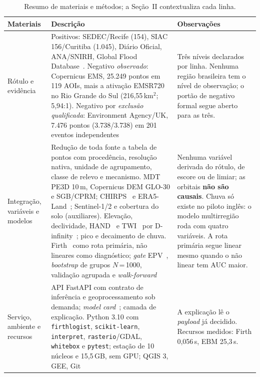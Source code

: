 \documentclass[conference]{IEEEtran}
\begin{document}
\begin{table}[!t]
\caption{Resumo de materiais e métodos; a Seção~II contextualiza cada linha.}
\label{tab:mm}
\centering
\renewcommand{\arraystretch}{0.95}
\scriptsize
\begin{tabular}{@{}>{\raggedright\arraybackslash}p{2.05cm}>{\raggedright\arraybackslash}p{7.6cm}>{\raggedright\arraybackslash}p{6.5cm}@{}}
\toprule
\textbf{Materiais} & \textbf{Descrição} & \textbf{Observações} \\
\midrule
Rótulo e evidência &
Positivos: SEDEC/Recife (154), SIAC 156/Curitiba (1.045), Diário Oficial,
ANA/SNIRH, Global Flood Database~\cite{tellman2021}. Negativo \emph{observado}:
Copernicus EMS, 25.249 pontos em 119 AOIs, mais a ativação EMSR720 no Rio Grande do
Sul (216,55\,km$^2$; 5,94:1). Negativo por \emph{exclusão qualificada}: Environment
Agency/UK, 7.476 pontos (3.738/3.738) em 201 eventos independentes &
Três níveis declarados por linha. Nenhuma região brasileira tem o nível de
observação; o portão de negativo formal segue aberto para as três. \\
Integração, variáveis e modelos &
Redução de toda fonte a tabela de pontos com procedência, resolução nativa, unidade
de agrupamento, classe de relevo e mecanismo. MDT PE3D 10\,m, Copernicus DEM GLO-30 e
SGB/CPRM; CHIRPS~\cite{funk2015} e ERA5-Land~\cite{munoz2021}; Sentinel-1/2 e cobertura
do solo (auxiliares). Elevação, declividade, HAND~\cite{renno2008} e TWI~\cite{beven1979}
por D-infinity~\cite{tarboton1997}; pico e decaimento de chuva. Firth~\cite{firth1993}
como rota primária, não lineares como diagnóstico; \emph{gate} EPV~\cite{peduzzi1996},
\emph{bootstrap} de grupos $N$\,=\,1000, validação agrupada e \emph{walk-forward} &
Nenhuma variável derivada do rótulo, de escore ou de limiar; as orbitais \textbf{não
são causais}. Chuva só existe no piloto inglês: o modelo multirregião roda com quatro
variáveis. A rota primária segue linear mesmo quando o não linear tem AUC maior. \\
Serviço, ambiente e recursos &
API FastAPI com contrato de inferência e geoprocessamento sob demanda; \emph{model
card}~\cite{mitchell2019}; camada de explicação. Python 3.10 com \texttt{firthlogist},
\texttt{scikit-learn}, \texttt{interpret}, \texttt{rasterio}/GDAL, \texttt{whitebox} e
\texttt{pytest}; estação de 10 núcleos e 15,5\,GB, sem GPU; QGIS 3, GEE, Git &
A explicação lê o \emph{payload} já decidido. Recursos medidos: Firth 0,056\,s,
EBM 25,3\,s. \\
\bottomrule
\end{tabular}
\end{table}
\end{document}
